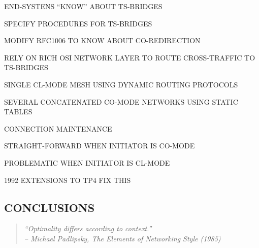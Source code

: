 \begin{bwslide}

\begin{nrtc}
\item	END-SYSTENS ``KNOW'' ABOUT TS-BRIDGES

\item	SPECIFY PROCEDURES FOR TS-BRIDGES

\item	MODIFY RFC1006 TO KNOW ABOUT CO-REDIRECTION
\end{nrtc}
\end{bwslide}


\begin{bwslide}

\begin{nrtc}
\item	RELY ON RICH OSI NETWORK LAYER TO ROUTE CROSS-TRAFFIC TO TS-BRIDGES
    \begin{nrtc}
    \item	SINGLE CL-MODE MESH USING DYNAMIC ROUTING PROTOCOLS

    \item	SEVERAL CONCATENATED CO-MODE NETWORKS USING STATIC TABLES
    \end{nrtc}

\item	CONNECTION MAINTENANCE
    \begin{nrtc}
    \item	STRAIGHT-FORWARD WHEN INITIATOR IS CO-MODE

    \item	PROBLEMATIC WHEN INITIATOR IS CL-MODE
	\begin{nrtc}
	\item	1992 EXTENSIONS TO TP4 FIX THIS
	\end{nrtc}
    \end{nrtc}
\end{nrtc}
\end{bwslide}


\begin{bwslide}
\part*	{CONCLUSIONS}\bf

\begin{quote}\em
``Optimality differs according to context.''\\ \raggedleft
-- Michael Padlipsky, The Elements of Networking Style (1985)
\end{quote}
\end{bwslide}


